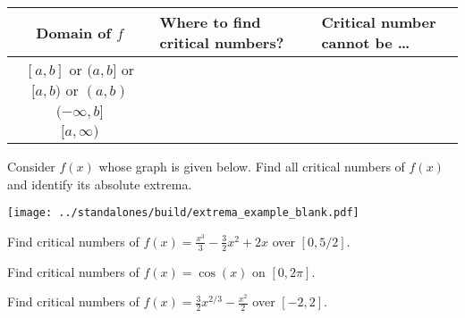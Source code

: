 \documentclass[../main.tex]{subfiles}
\begin{document}
  \begin{center}
    \begin{tabular}{c|l|l}
      Domain of \(f\) & Where to find critical numbers? & Critical number cannot be \ldots{} \\\midrule
      \([a,b]\) or \((a,b]\) or \([a,b)\) or \((a,b)\) & & \\[1ex]\midrule
      \((-\infty, b]\) & & \\[1ex]\midrule
      \([a, \infty)\) & & \\[1ex]\midrule
    \end{tabular}
  \end{center}
  
  \begin{example} \label{ex:critical-numbers}
    Consider \(f(x)\) whose graph is given below. Find all critical numbers of \(f(x)\) and identify its absolute extrema.

    \begin{center}
      \texttt{[image: ../standalones/build/extrema\_example\_blank.pdf]}
    \end{center}
  \end{example}
  \clearpage

  \begin{example} \label{ex:critical-number-polynomial}
    Find critical numbers of \(f(x) = \frac{x^{3}}{3} - \frac{3}{2}x^{2} + 2x\) over \([0, 5/2]\).
  \end{example}

  \begin{example} \label{ex:critical-number-trig}
    Find critical numbers of \(f(x) = \cos(x)\) on \([0, 2\pi]\).

  \end{example}

  \begin{example} \label{ex:critical-number-rational}
    Find critical numbers of \(f(x) = \frac{3}{2} x^{2/3} - \frac{x^{2}}{2}\) over \([-2,2]\). 

  \end{example}
  \clearpage
\end{document}
